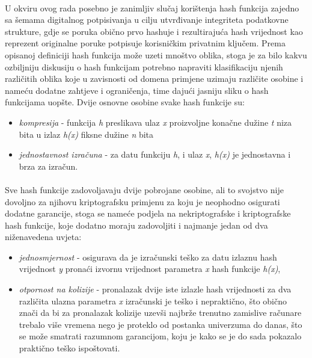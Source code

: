 \paragraph*{}
U okviru ovog rada posebno je zanimljiv slučaj korištenja hash funkcija zajedno sa šemama digitalnog potpisivanja u cilju utvrđivanje integriteta podatkovne strukture, gdje se poruka obično prvo hashuje i rezultirajuća hash vrijednost kao reprezent originalne poruke potpisuje korisničkim privatnim ključem. Prema opisanoj definiciji hash funkcija može uzeti mnoštvo oblika, stoga je za bilo kakvu ozbiljniju diskusiju o hash funkcijam potrebno napraviti klasifikaciju njenih različitih oblika koje u zavisnosti od domena primjene uzimaju različite osobine i nameću dodatne zahtjeve i ograničenja, time dajući jasniju sliku o hash funkcijama uopšte. Dvije osnovne osobine svake hash funkcije su:

\begin{itemize}
    \item \textit{kompresija} - funkcija \textit{h} preslikava ulaz \textit{x} proizvoljne konačne dužine \textit{t} niza bita u izlaz \textit{h(x)} fiksne dužine \textit{n} bita
    \item \textit{jednostavnost izračuna} - za datu funkciju \textit{h}, i ulaz \textit{x}, \textit{h(x)} je jednostavna i brza za izračun.
\end{itemize}

\paragraph*{}
Sve hash funkcije zadovoljavaju dvije pobrojane osobine, ali to svojstvo nije dovoljno za njihovu kriptografsku primjenu za koju je neophodno osigurati dodatne garancije, stoga se nameće podjela na nekriptografske i kriptografske hash funkcije, koje dodatno moraju zadovoljiti i najmanje jedan od dva niženavedena uvjeta:

\begin{itemize}
    \item \textit{jednosmjernost} - osigurava da je izračunski teško za datu izlaznu hash vrijednost \textit{y} pronaći izvornu vrijednost parametra \textit{x} hash funkcije \textit{h(x)},
    \item \textit{otpornost na kolizije} - pronalazak dvije iste izlazle hash vrijednosti za dva različita ulazna parametra \textit{x} izračunski je teško i nepraktično, što obično znači da bi za pronalazak kolizije uzevši najbrže trenutno zamislive računare trebalo više vremena nego je proteklo od postanka univerzuma do danas, što se može smatrati razumnom garancijom, koju je kako se je do sada pokazalo praktično teško ispoštovati.
\end{itemize}

